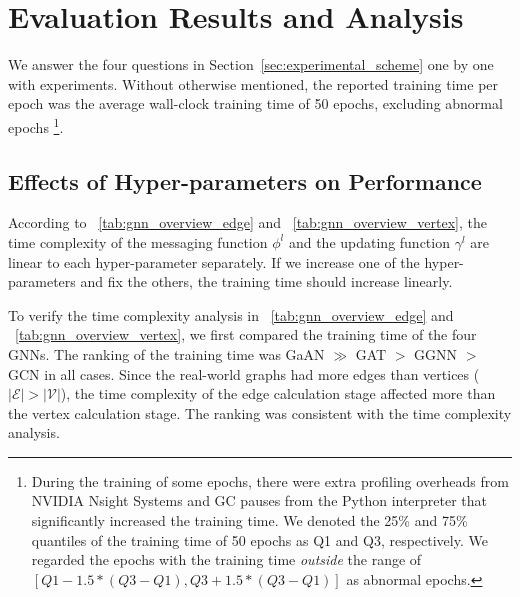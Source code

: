 \section{Evaluation Results and Analysis}
\label{sec:experiment_results}

We answer the four questions in Section~\ref{sec:experimental_scheme} one by one with experiments.
Without otherwise mentioned, the reported training time per epoch was the average wall-clock training time of 50 epochs, excluding abnormal epochs \footnote{During the training of some epochs, there were extra profiling overheads from NVIDIA Nsight Systems and GC pauses from the Python interpreter that significantly increased the training time. We denoted the 25\% and 75\% quantiles of the training time of 50 epochs as Q1 and Q3, respectively. We regarded the epochs with the training time \emph{outside} the range of $[Q1 - 1.5 * (Q3-Q1), Q3 + 1.5 * (Q3-Q1)]$ as abnormal epochs.}.

\subsection{Effects of Hyper-parameters on Performance}
\label{sec:effects_of_hyper-parameters_on_performance}

According to \tablename~\ref{tab:gnn_overview_edge} and \tablename~\ref{tab:gnn_overview_vertex}, the time complexity of the messaging function $\phi^l$ and the updating function $\gamma^l$ are linear to each hyper-parameter separately.
%
If we increase one of the hyper-parameters and fix the others, the training time should increase linearly.

To verify the time complexity analysis in \tablename~\ref{tab:gnn_overview_edge} and \tablename~\ref{tab:gnn_overview_vertex}, we first compared the training time of the four GNNs.
%
The ranking of the training time was GaAN $\gg$ GAT $>$ GGNN $>$ GCN in all cases.
%
Since the real-world graphs had more edges than vertices ($|\mathcal{E}| > |\mathcal{V}|$), the time complexity of the edge calculation stage affected more than the vertex calculation stage.
%
The ranking was consistent with the time complexity analysis.

